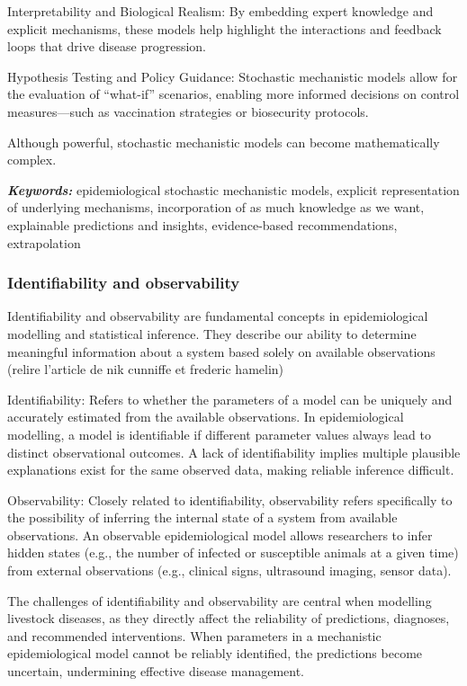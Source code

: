 Interpretability and Biological Realism: By embedding expert knowledge and explicit mechanisms, these models help highlight the interactions and feedback loops that drive disease progression.

Hypothesis Testing and Policy Guidance: Stochastic mechanistic models allow for the evaluation of “what-if” scenarios, enabling more informed decisions on control measures—such as vaccination strategies or biosecurity protocols.

Although powerful, stochastic mechanistic models can become mathematically complex.

\textit{\textbf{Keywords:}} epidemiological stochastic mechanistic models, explicit representation of underlying mechanisms, incorporation of as much knowledge as we want, explainable predictions and insights, evidence-based recommendations, extrapolation


\subsubsection{Identifiability and observability}

Identifiability and observability are fundamental concepts in epidemiological modelling and statistical inference. They describe our ability to determine meaningful information about a system based solely on available observations (relire l'article de nik cunniffe et frederic hamelin)

Identifiability: Refers to whether the parameters of a model can be uniquely and accurately estimated from the available observations. In epidemiological modelling, a model is identifiable if different parameter values always lead to distinct observational outcomes. A lack of identifiability implies multiple plausible explanations exist for the same observed data, making reliable inference difficult.

Observability: Closely related to identifiability, observability refers specifically to the possibility of inferring the internal state of a system from available observations. An observable epidemiological model allows researchers to infer hidden states (e.g., the number of infected or susceptible animals at a given time) from external observations (e.g., clinical signs, ultrasound imaging, sensor data).

The challenges of identifiability and observability are central when modelling livestock diseases, as they directly affect the reliability of predictions, diagnoses, and recommended interventions. When parameters in a mechanistic epidemiological model cannot be reliably identified, the predictions become uncertain, undermining effective disease management.

